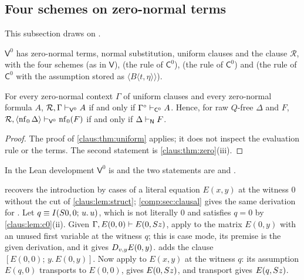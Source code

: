 \subsection{Four schemes on zero-normal terms}
\label{claus:sec:four}

This subsection draws on .

\begin{definition}
\label{claus:def:v0}
$\mathsf{V}^{0}$ has zero-normal terms, normal substitution, uniform
clauses and the clause $\mathcal{R}$, with the four schemes
 (as in $\mathsf{V}$),  (the rule
 of $\mathsf{C}^{0}$),  (the rule
 of $\mathsf{C}^{0}$) and  (the rule
 of $\mathsf{C}^{0}$ with the assumption stored as
$\langle B\langle t,\eta\rangle\rangle$).
\end{definition}

\begin{theorem}
\label{claus:thm:four}
For every zero-normal context $\Gamma$ of uniform clauses and every
zero-normal formula $A$,
$\mathcal{R},\Gamma\vdash_{\mathsf{V}^{0}}A$ if and only if
$\Gamma^{\circ}\vdash_{\mathsf{C}^{0}}A$. Hence, for raw $Q$-free $\Delta$
and $F$,
$\mathcal{R},\langle\operatorname{nf}_0\Delta\rangle\vdash_{\mathsf{V}^{0}}\operatorname{nf}_0(F)$ if and
only if $\Delta\vdash_{\mathsf{N}}F$.
\end{theorem}
\begin{proof}
The proof of \cref{claus:thm:uniform} applies; it does not inspect the
evaluation rule or the terms. The second statement is
\cref{claus:thm:zero}(iii).
\end{proof}

In the Lean development $\mathsf{V}^{0}$ is  and the two
statements are  and .

\begin{remark}
\label{claus:rem:nocut}
 recovers the introduction by cases of a literal
equation $E(x,y)$ at the witness $0$ without the cut of
\cref{claus:lem:struct}; \cref{comp:sec:clausal} gives the same derivation
for . Let $q\equiv I(S 0,0;\,u.\,u)$, which is not
literally $0$ and satisfies $q=0$ by \cref{claus:lem:c0}(ii). Given
$\Gamma,E(0,0)\vdash E(0,S z)$, apply  to the matrix
$E(0,y)$ with an unused first variable at the witness $q$; this is case
mode, its premise is the given derivation, and it gives
$D_{v,y}E(0,y)$.  adds the clause
$[E(0,0);\,y.\,E(0,y)]$. Now apply  to $E(x,y)$ at the
witness $q$: its assumption $E(q,0)$ transports to $E(0,0)$,
 gives $E(0,S z)$, and transport gives $E(q,S z)$.
\end{remark}

